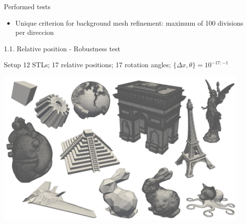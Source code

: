 \documentclass{beamer}
\begin{document}
\begin{frame}{Performed tests}
\begin{itemize}
\begin{itemize}
        \item
          Unique criterion for background mesh refinement: maximum of 100 divisions per direccion
      \end{itemize}
  \end{itemize}
%
%
%
%    
%    
%
%
\end{frame}

\begin{frame}{1.1. Relative position - Robustness test}
  \begin{block}{Setup}
    12 STLs; 17 relative positions; 17 rotation angles;  $\{\Delta x, \theta\} = 10^{-17:-1}$
  \end{block}
  \includegraphics[width=0.95\textwidth]{matrix.pdf}
\end{frame}
\end{document}
